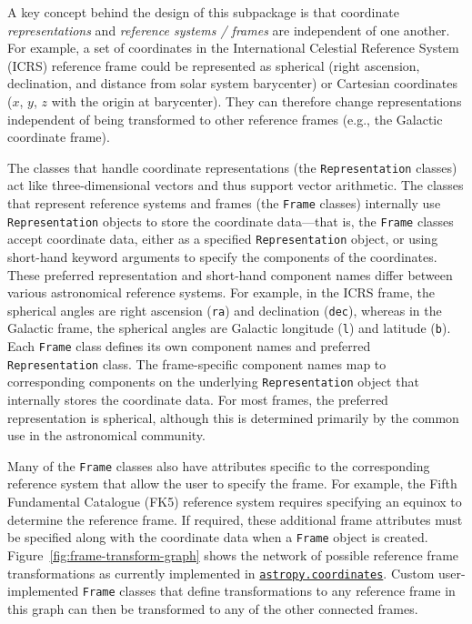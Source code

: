 \documentclass[modern]{aastex62}
\renewcommand{\figurename}{Figure\xspace}
\newcommand{\astropysubpkg}[1]{\href{http://docs.astropy.org/en/stable/#1/index.html}{\texttt{astropy.#1}}\xspace}
\begin{document}
A key concept behind the design of this subpackage is that coordinate
\textit{representations} and \textit{reference systems / frames} are independent
of one another.
For example, a set of coordinates in the International Celestial Reference
System (ICRS) reference frame could be represented as spherical (right
ascension, declination, and distance from solar system barycenter) or Cartesian
coordinates ($x$, $y$, $z$ with the origin at barycenter).
They can therefore change representations independent of being transformed to
other reference frames (e.g., the Galactic coordinate frame).

The classes that handle coordinate representations (the \texttt{Representation}
classes) act like three-dimensional vectors and thus support vector arithmetic.
The classes that represent reference systems and frames (the \texttt{Frame}
classes) internally use \texttt{Representation} objects to store the coordinate
data---that is, the \texttt{Frame} classes accept coordinate data, either as a
specified \texttt{Representation} object, or using short-hand keyword arguments
to specify the components of the coordinates.
These preferred representation and short-hand component names differ between
various astronomical reference systems.
For example, in the ICRS frame, the spherical angles are right ascension
(\texttt{ra}) and declination (\texttt{dec}), whereas in the Galactic frame, the
spherical angles are Galactic longitude (\texttt{l}) and latitude (\texttt{b}).
Each \texttt{Frame} class defines its own component names and preferred \texttt{Representation} class.
The frame-specific component names map to corresponding components on the
underlying \texttt{Representation} object that internally stores the coordinate
data.
For most frames, the preferred representation is spherical, although this is
determined primarily by the common use in the astronomical community.

Many of the \texttt{Frame} classes also have attributes specific to the
corresponding reference system that allow the user to specify the frame.
For example, the Fifth Fundamental Catalogue (FK5) reference system requires
specifying an equinox to determine the reference frame.
If required, these additional frame attributes must be specified along with the
coordinate data when a \texttt{Frame} object is created.
\figurename~\ref{fig:frame-transform-graph} shows the network of possible
reference frame transformations as currently implemented in
\astropysubpkg{coordinates}.
Custom user-implemented \texttt{Frame} classes that define transformations to
any reference frame in this graph can then be transformed to any of the other
connected frames.
\end{document}
